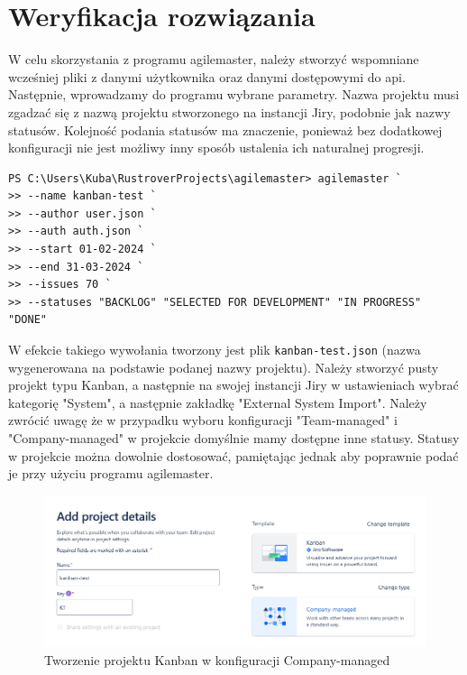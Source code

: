 \section{Weryfikacja rozwiązania}
W celu skorzystania z programu agilemaster, należy stworzyć wspomniane wcześniej pliki z danymi użytkownika oraz danymi dostępowymi do api.
Następnie, wprowadzamy do programu wybrane parametry. Nazwa projektu musi zgadzać się z nazwą projektu stworzonego na instancji Jiry, podobnie jak nazwy statusów.
Kolejność podania statusów ma znaczenie, ponieważ bez dodatkowej konfiguracji nie jest możliwy inny sposób ustalenia ich naturalnej progresji.
\begin{lstlisting}[caption=Przykładowe użycie programu agilemaster]
PS C:\Users\Kuba\RustroverProjects\agilemaster> agilemaster `
>> --name kanban-test `
>> --author user.json `
>> --auth auth.json `
>> --start 01-02-2024 `
>> --end 31-03-2024 `
>> --issues 70 `
>> --statuses "BACKLOG" "SELECTED FOR DEVELOPMENT" "IN PROGRESS" "DONE"
\end{lstlisting}

W efekcie takiego wywołania tworzony jest plik \texttt{kanban-test.json} (nazwa wygenerowana na podstawie podanej nazwy projektu).
Należy stworzyć pusty projekt typu Kanban, a następnie na swojej instancji Jiry w ustawieniach wybrać kategorię "System", a następnie zakładkę "External System Import".
Należy zwrócić uwagę że w przypadku wyboru konfiguracji "Team-managed" i "Company-managed" w projekcie domyślnie mamy dostępne inne statusy.
Statusy w projekcie można dowolnie dostosować, pamiętając jednak aby poprawnie podać je przy użyciu programu agilemaster.
\begin{figure}[H]
    \centering
    \includegraphics[width=15cm,keepaspectratio]{rysunki/jira-create-project.png}
    \caption{Tworzenie projektu Kanban w konfiguracji Company-managed}
\end{figure}


